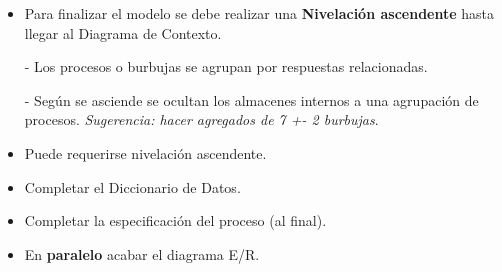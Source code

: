 \begin{itemize}[noitemsep]
\item Para finalizar el modelo se debe realizar una \textbf{Nivelación ascendente} hasta llegar al Diagrama de Contexto.

  - Los procesos o burbujas se agrupan por respuestas relacionadas.

  - Según se asciende se ocultan los almacenes internos a una agrupación de procesos. \textit{Sugerencia: hacer agregados de 7 +- 2 burbujas}.

\item Puede requerirse nivelación ascendente.
\item Completar el Diccionario de Datos.
\item Completar la especificación del proceso (al final).
\item En \textbf{paralelo} acabar el diagrama E/R.
\end{itemize}

